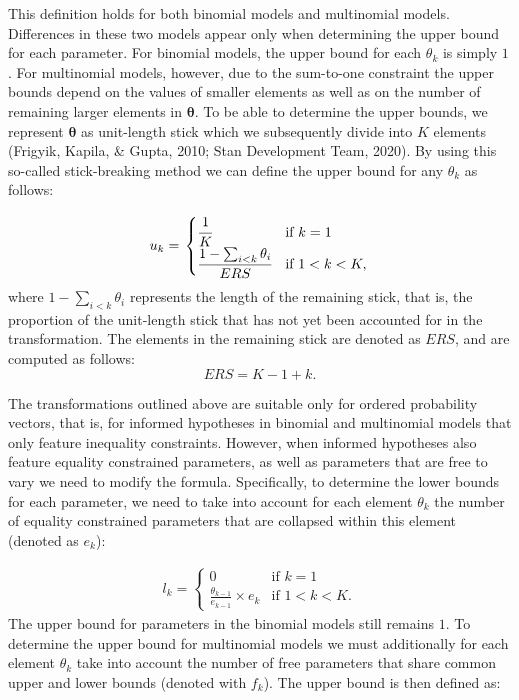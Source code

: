 \documentclass[
  english,
  man,floatsintext]{apa6}
\begin{document}
\begin{appendix}
This definition holds for both binomial models and multinomial models.
Differences in these two models appear only when determining the upper
bound for each parameter. For binomial models, the upper bound for each
\(\theta_k\) is simply \(1\). For multinomial models, however, due to
the sum-to-one constraint the upper bounds depend on the values of
smaller elements as well as on the number of remaining larger elements
in \(\boldsymbol{\theta}\). To be able to determine the upper bounds, we
represent \(\boldsymbol{\theta}\) as unit-length stick which we
subsequently divide into \(K\) elements (Frigyik, Kapila, \& Gupta,
2010; Stan Development Team, 2020). By using this so-called
stick-breaking method we can define the upper bound for any \(\theta_k\)
as follows:

\begin{align}
\label{Eq:upperBound}
u_k = \left.
\begin{cases}
\cfrac{1}{K} & \text{if } k = 1 \\
\cfrac{1 - \sum_{i < k} \theta_i}{ERS} & \text{if } 1 < k < K,
\end{cases}
\right.
\end{align} where \(1 - \sum_{i < k} \theta_i\) represents the length of
the remaining stick, that is, the proportion of the unit-length stick
that has not yet been accounted for in the transformation. The elements
in the remaining stick are denoted as \(ERS\), and are computed as
follows: \[ERS = K - 1 + k.\]

The transformations outlined above are suitable only for ordered
probability vectors, that is, for informed hypotheses in binomial and
multinomial models that only feature inequality constraints. However,
when informed hypotheses also feature equality constrained parameters,
as well as parameters that are free to vary we need to modify the
formula. Specifically, to determine the lower bounds for each parameter,
we need to take into account for each element \(\theta_k\) the number of
equality constrained parameters that are collapsed within this element
(denoted as \(e_k\)):

\begin{align}
l_k = \left.
\begin{cases}
0 & \text{if } k = 1 \\
\frac{\theta_{k - 1}}{e_{k-1}} \times e_k & \text{if } 1 < k < K.
\end{cases}
\right.
\end{align} The upper bound for parameters in the binomial models still
remains \(1\). To determine the upper bound for multinomial models we
must additionally for each element \(\theta_k\) take into account the
number of free parameters that share common upper and lower bounds
(denoted with \(f_k\)). The upper bound is then defined as:


\end{appendix}
\end{document}
